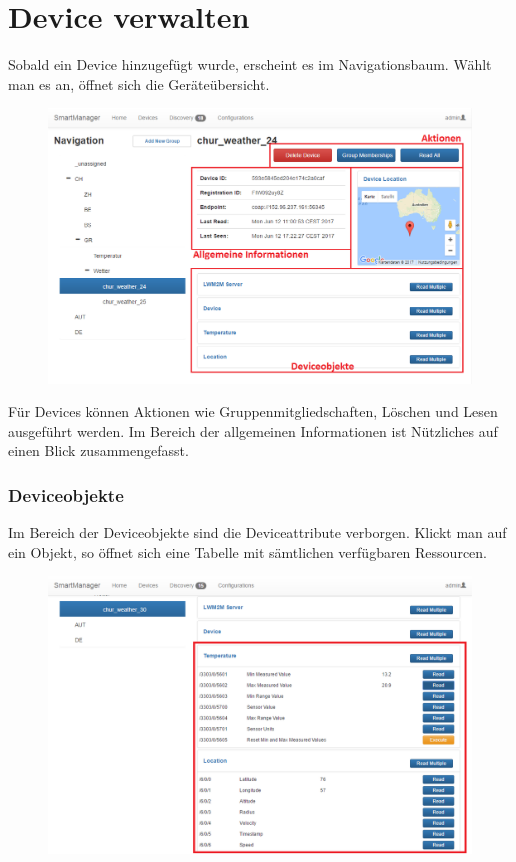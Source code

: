 \section{Device verwalten}
Sobald ein Device hinzugefügt wurde, erscheint es im Navigationsbaum. Wählt man es an, öffnet sich die Geräteübersicht.

\begin{figure}[H]
\includegraphics[scale=0.57]{../05_Schlussbericht/images/benutzeranleitung/device_overview.png}
\end{figure} 

Für Devices können Aktionen wie Gruppenmitgliedschaften, Löschen und Lesen ausgeführt werden. Im Bereich der allgemeinen Informationen ist Nützliches auf einen Blick zusammengefasst.

\subsubsection{Deviceobjekte}
Im Bereich der Deviceobjekte sind die Deviceattribute verborgen. Klickt man auf ein Objekt, so öffnet sich eine Tabelle mit sämtlichen verfügbaren Ressourcen.
\begin{figure}[H]
\includegraphics[scale=0.57]{../05_Schlussbericht/images/benutzeranleitung/devicefragment.png}
\end{figure}

